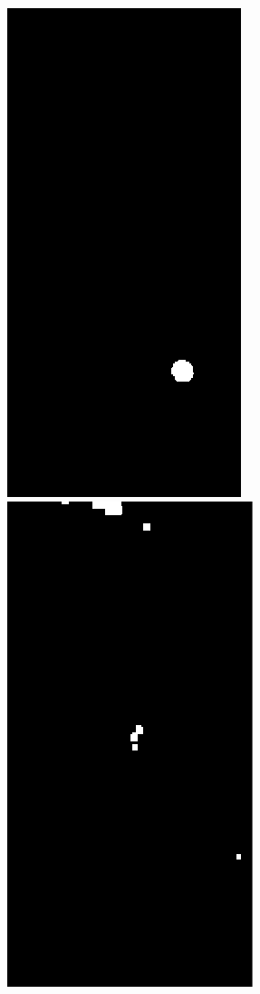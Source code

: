 \begin{figure} [h]
\begin{minipage}[t]{0.25\textwidth}
\vspace{0pt}
\includegraphics[scale =0.45]{images/bin_puck}
\end{minipage}
\hspace{0.05\textwidth}
\begin{minipage}[t]{0.25\textwidth}
\vspace{0pt}
\includegraphics[scale =0.45]{images/bin_robo}

\end{minipage}
\end{figure}
